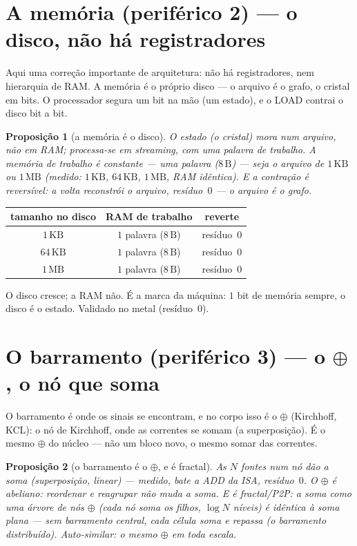 \documentclass[11pt,a4paper]{article}
\newtheorem{proposicao}{Proposição}
\begin{document}
\section{A memória (periférico 2) --- o disco, não há registradores}

Aqui uma correção importante de arquitetura: não há registradores, nem hierarquia de RAM.
A memória é o próprio disco --- o arquivo é o grafo, o cristal em bits. O processador segura
um bit na mão (um estado), e o LOAD contrai o disco bit a bit.

\begin{proposicao}[a memória é o disco]
O estado (o cristal) mora num arquivo, não em RAM; processa-se em streaming, com uma palavra de trabalho.
A memória de trabalho é constante --- uma palavra ($8\,\mathrm{B}$) --- seja o arquivo de $1\,\mathrm{KB}$ ou $1\,\mathrm{MB}$
(medido: $1\,\mathrm{KB}$, $64\,\mathrm{KB}$, $1\,\mathrm{MB}$, RAM idêntica). E a contração é reversível:
a volta reconstrói o arquivo, resíduo~$0$ --- o arquivo é o grafo.
\end{proposicao}

\begin{center}
\begin{tabular}{ccc}
\toprule
tamanho no disco & RAM de trabalho & reverte \\
\midrule
$1\,\mathrm{KB}$ & $1$ palavra ($8\,\mathrm{B}$) & resíduo~$0$ \\
$64\,\mathrm{KB}$ & $1$ palavra ($8\,\mathrm{B}$) & resíduo~$0$ \\
$1\,\mathrm{MB}$ & $1$ palavra ($8\,\mathrm{B}$) & resíduo~$0$ \\
\bottomrule
\end{tabular}
\end{center}

O disco cresce; a RAM não. É a marca da máquina: $1$ bit de memória sempre, o disco é o estado.
Validado no metal (resíduo~$0$).

\section{O barramento (periférico 3) --- o $\oplus$, o nó que soma}

O barramento é onde os sinais se encontram, e no corpo isso é o $\oplus$ (Kirchhoff, KCL): o nó de
Kirchhoff, onde as correntes se somam (a superposição). É o mesmo $\oplus$ do núcleo --- não um
bloco novo, o mesmo somar das correntes.

\begin{proposicao}[o barramento é o $\oplus$, e é fractal]
As $N$ fontes num nó dão a soma (superposição, linear) --- medido, bate a ADD da ISA, resíduo~$0$.
O $\oplus$ é abeliano: reordenar e reagrupar não muda a soma. E é fractal/P2P: a soma como uma árvore
de nós $\oplus$ (cada nó soma os filhos, $\log N$ níveis) é idêntica à soma plana --- sem barramento central,
cada célula soma e repassa (o barramento distribuído). Auto-similar: o mesmo $\oplus$ em toda escala.
\end{proposicao}
\end{document}
